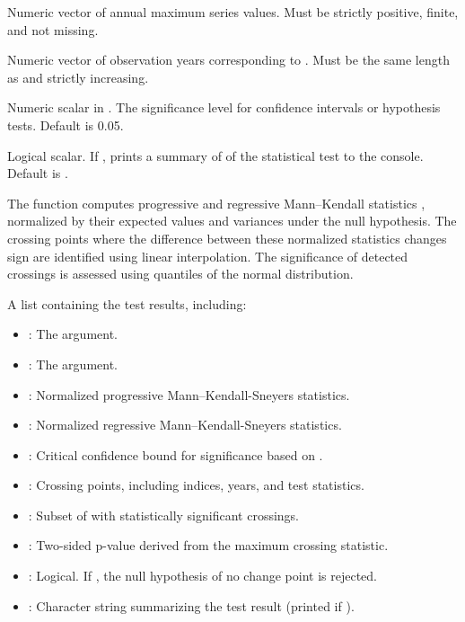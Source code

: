 \documentclass[a4paper]{book}
\begin{document}
%
\begin{Arguments}
\begin{ldescription}
\item[\code{data}] Numeric vector of annual maximum series values.
Must be strictly positive, finite, and not missing.

\item[\code{years}] Numeric vector of observation years corresponding to .
Must be the same length as  and strictly increasing.

\item[\code{alpha}] Numeric scalar in \eqn{[0.01, 0.1]}{}. The significance
level for confidence intervals or hypothesis tests. Default is 0.05.

\item[\code{quiet}] Logical scalar. If , prints a summary of of the statistical
test to the console. Default is .
\end{ldescription}
\end{Arguments}
%
\begin{Details}
The function computes progressive and regressive Mann–Kendall statistics ,
normalized by their expected values and variances under the null hypothesis. The
crossing points where the difference between these normalized statistics changes
sign are identified using linear interpolation. The significance of detected
crossings is assessed using quantiles of the normal distribution.
\end{Details}
%
\begin{Value}
A list containing the test results, including:
\begin{itemize}

\item{} : The  argument.
\item{} : The  argument.
\item{} : Normalized progressive Mann–Kendall-Sneyers statistics.
\item{} : Normalized regressive Mann–Kendall-Sneyers statistics.
\item{} : Critical confidence bound for significance based on .
\item{} : Crossing points, including indices, years, and test statistics.
\item{} : Subset of  with statistically significant crossings.
\item{} : Two-sided p-value derived from the maximum crossing statistic.
\item{} : Logical. If , the null hypothesis of no change point is rejected.
\item{} : Character string summarizing the test result (printed if ).

\end{itemize}

\end{Value}
\end{document}
